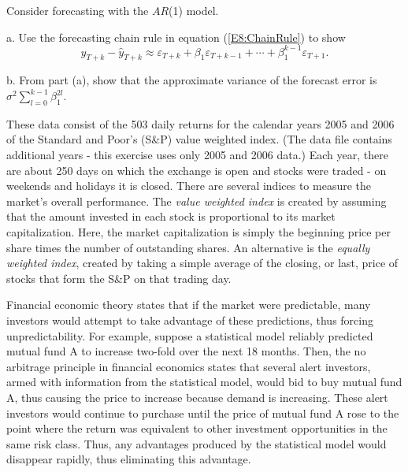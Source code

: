 \begin{exercises}
\item Consider forecasting with the $AR$(1) model.

a. Use the forecasting chain rule in equation (\ref{E8:ChainRule})
to show
\begin{equation*}
y_{T+k}-\widehat{y}_{T+k} \approx \varepsilon_{T+k} + \beta_1
\varepsilon_{T+k-1} + \cdots + \beta_1^{k-1} \varepsilon_{T+1}.
\end{equation*}

b. From part (a), show that the approximate variance of the forecast
error is $\sigma^2 \sum_{l=0}^{k-1} \beta_1^{2l}.$


\item These data consist of the 503 daily returns for the calendar
years 2005 and 2006 of the Standard and Poor's (S\&P) value weighted
index. (The data file contains additional years - this exercise uses
only 2005 and 2006 data.) Each year, there are about 250 days on
which the exchange is open and stocks were traded - on weekends and
holidays it is closed. There are several indices to measure the
market's overall performance. The \textit{value weighted index} is
created by assuming that the amount invested in each stock is
proportional to its market capitalization. Here, the market
capitalization is simply the beginning price per share times the
number of outstanding shares. An alternative is the \textit{equally
weighted index}, created by taking a simple average of the closing,
or last, price of stocks that form the S\&P on that trading day.

Financial economic theory states that if the market were predictable, many
investors would attempt to take advantage of these predictions, thus forcing
unpredictability. For example, suppose a statistical model reliably
predicted mutual fund A to increase two-fold over the next 18 months. Then,
the no arbitrage principle in financial economics states that several alert
investors, armed with information from the statistical model, would bid to
buy mutual fund A, thus causing the price to increase because demand is
increasing. These alert investors would continue to purchase until the price
of mutual fund A rose to the point where the return was equivalent to other
investment opportunities in the same risk class. Thus, any advantages
produced by the statistical model would disappear rapidly, thus eliminating
this advantage.


\end{exercises}
